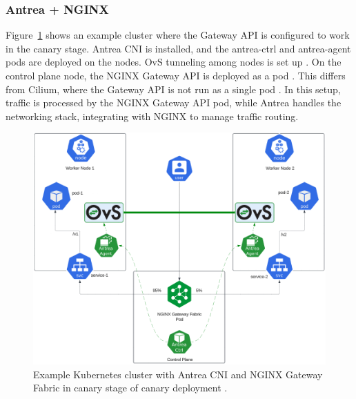 \subsubsection{Antrea + NGINX}
\label{subsection:antreaIngress}

Figure~\ref{fig:canaryAntreaImg} shows an example cluster where the Gateway API is configured to work in the canary stage. Antrea CNI is installed, and the antrea-ctrl and antrea-agent pods are deployed on the nodes. OvS tunneling among nodes is set up \cite{AntreaDocs}. On the control plane node, the NGINX Gateway API is deployed as a pod \cite{NGINX}. This differs from Cilium, where the Gateway API is not run as a single pod \cite{CiliumDocs}. In this setup, traffic is processed by the NGINX Gateway API pod, while Antrea handles the networking stack, integrating with NGINX to manage traffic routing.

\begin{figure}[H]
    \centering
    \includegraphics[width=1\columnwidth]{images/antrea-nginx.png}
    \caption{Example Kubernetes cluster with Antrea CNI and NGINX Gateway Fabric in canary stage of canary deployment \cite{KubernetesDocs}\cite{AntreaDocs}.}
    \label{fig:canaryAntreaImg}
\end{figure}

